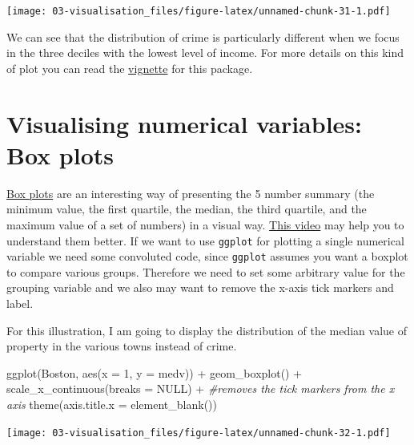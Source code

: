 \documentclass[
]{book}
\newenvironment{Shaded}{\begin{snugshade}}{\end{snugshade}}
\newcommand{\AttributeTok}[1]{\textcolor[rgb]{0.77,0.63,0.00}{#1}}
\newcommand{\CommentTok}[1]{\textcolor[rgb]{0.56,0.35,0.01}{\textit{#1}}}
\newcommand{\ConstantTok}[1]{\textcolor[rgb]{0.00,0.00,0.00}{#1}}
\newcommand{\DecValTok}[1]{\textcolor[rgb]{0.00,0.00,0.81}{#1}}
\newcommand{\FunctionTok}[1]{\textcolor[rgb]{0.00,0.00,0.00}{#1}}
\newcommand{\NormalTok}[1]{#1}
\newcommand{\SpecialCharTok}[1]{\textcolor[rgb]{0.00,0.00,0.00}{#1}}
\begin{document}
\texttt{[image: 03-visualisation\_files/figure-latex/unnamed-chunk-31-1.pdf]}

We can see that the distribution of crime is particularly different when we focus in the three deciles with the lowest level of income. For more details on this kind of plot you can read the \href{https://cran.r-project.org/web/packages/ggridges/vignettes/introduction.html}{vignette} for this package.

\hypertarget{visualising-numerical-variables-box-plots}{%
\section{Visualising numerical variables: Box plots}\label{visualising-numerical-variables-box-plots}}

\href{http://tomhopper.me/2014/07/04/the-most-useful-data-plot-youve-never-used/}{Box plots} are an interesting way of presenting the 5 number summary (the minimum value, the first quartile, the median, the third quartile, and the maximum value of a set of numbers) in a visual way. \href{http://www.learner.org/courses/againstallodds/unitpages/unit05.html}{This video} may help you to understand them better. If we want to use \texttt{ggplot} for plotting a single numerical variable we need some convoluted code, since \texttt{ggplot} assumes you want a boxplot to compare various groups. Therefore we need to set some arbitrary value for the grouping variable and we also may want to remove the x-axis tick markers and label.

For this illustration, I am going to display the distribution of the median value of property in the various towns instead of crime.

\begin{Shaded}
\begin{Highlighting}[]
\FunctionTok{ggplot}\NormalTok{(Boston, }\FunctionTok{aes}\NormalTok{(}\AttributeTok{x =} \DecValTok{1}\NormalTok{, }\AttributeTok{y =}\NormalTok{ medv)) }\SpecialCharTok{+} 
  \FunctionTok{geom\_boxplot}\NormalTok{() }\SpecialCharTok{+}
  \FunctionTok{scale\_x\_continuous}\NormalTok{(}\AttributeTok{breaks =} \ConstantTok{NULL}\NormalTok{) }\SpecialCharTok{+} \CommentTok{\#removes the tick markers from the x axis}
  \FunctionTok{theme}\NormalTok{(}\AttributeTok{axis.title.x =} \FunctionTok{element\_blank}\NormalTok{())}
\end{Highlighting}
\end{Shaded}

\texttt{[image: 03-visualisation\_files/figure-latex/unnamed-chunk-32-1.pdf]}
\end{document}

